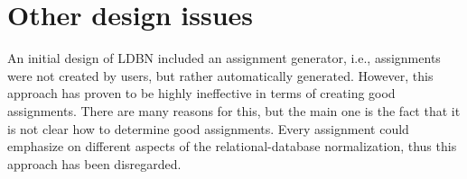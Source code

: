 \section{Other design issues}
An initial design of LDBN included an assignment generator, i.e., assignments were not
created by users, but rather automatically generated. However, this approach
has proven to be highly ineffective in terms of creating good assignments. There 
are many reasons for this, but the main one is the fact that it is not clear how
to determine good assignments. Every assignment could emphasize on different aspects of
the relational-database normalization, thus this approach has been disregarded.


